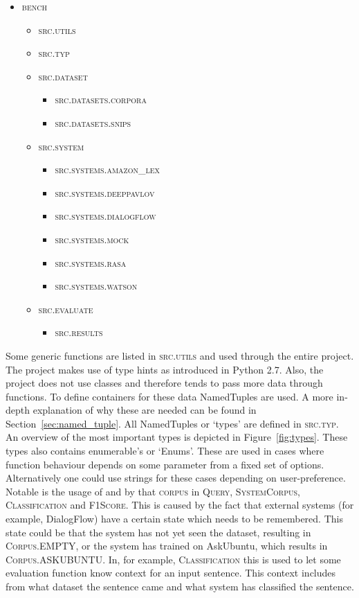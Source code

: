 \begin{itemize}
    \item \textsc{bench}
    \begin{itemize}
        \item \textsc{src.utils}
        \item \textsc{src.typ}
        \item \textsc{src.dataset}
        \begin{itemize}
            \item \textsc{src.datasets.corpora}
            \item \textsc{src.datasets.snips}
        \end{itemize}
        \item \textsc{src.system}
        \begin{itemize}
            \item \textsc{src.systems.amazon\_lex}
            \item \textsc{src.systems.deeppavlov}
            \item \textsc{src.systems.dialogflow}
            \item \textsc{src.systems.mock}
            \item \textsc{src.systems.rasa}
            \item \textsc{src.systems.watson}
        \end{itemize}
        \item \textsc{src.evaluate}
        \begin{itemize}
            \item \textsc{src.results}
        \end{itemize}
    \end{itemize}
\end{itemize}

Some generic functions are listed in \textsc{src.utils} and used through the entire project.
The project makes use of type hints as introduced in Python 2.7.
Also, the project does not use classes and therefore tends to pass more data through functions.
To define containers for these data NamedTuples are used.
A more in-depth explanation of why these are needed can be found in Section~\ref{sec:named_tuple}.
All NamedTuples or `types' are defined in \textsc{src.typ}.
An overview of the most important types is depicted in Figure~\ref{fig:types}.
These types also contains enumerable's or `Enums'.
These are used in cases where function behaviour depends on some parameter from a fixed set of options.
Alternatively one could use strings for these cases depending on user-preference.
Notable is the usage of  and by that \textsc{corpus} in \textsc{Query}, \textsc{SystemCorpus}, \textsc{Classification} and \textsc{F1Score}.
This is caused by the fact that external systems (for example, DialogFlow) have a certain state which needs to be remembered.
This state could be that the system has not yet seen the dataset, resulting in \textsc{Corpus.EMPTY}, or the system has trained on AskUbuntu, which results in \textsc{Corpus.ASKUBUNTU}.
In, for example, \textsc{Classification} this is used to let some evaluation function know context for an input sentence.
This context includes from what dataset the sentence came and what system has classified the sentence.

